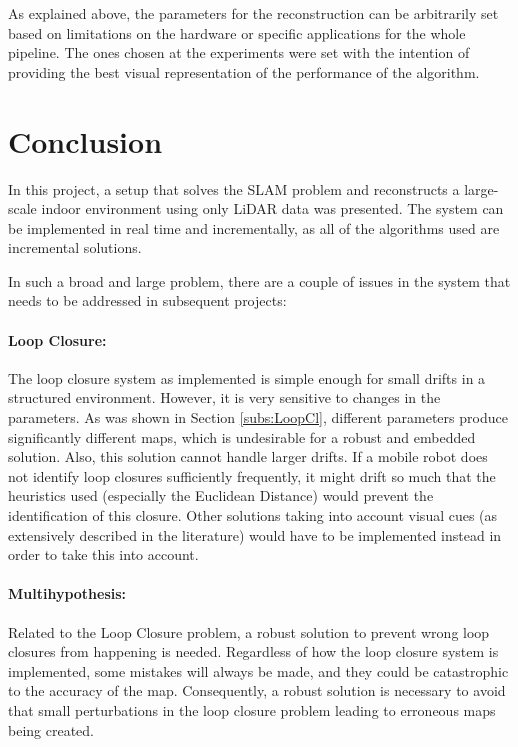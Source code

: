\documentclass[11pt]{article}
\begin{document}
As explained above, the parameters for the reconstruction can be arbitrarily set based on limitations on the hardware or specific applications for the whole pipeline. The ones chosen at the experiments were set with the intention of providing the best visual representation of the performance of the algorithm.
		
	\newpage
	\section{Conclusion}
	
In this project, a setup that solves the SLAM problem and reconstructs a large-scale indoor environment using only LiDAR data was presented. The system can be implemented in real time and incrementally, as all of the algorithms used are incremental solutions.
		
In such a broad and large problem, there are a couple of issues in the system that needs to be addressed in subsequent projects:
	
\paragraph{Loop Closure: } The loop closure system as implemented is simple enough for small drifts in a structured environment. However, it is very sensitive to changes in the parameters. As was shown in Section \ref{subs:LoopCl}, different parameters produce significantly different maps, which is undesirable for a robust and embedded solution. Also, this solution cannot handle larger drifts. If a mobile robot does not identify loop closures sufficiently frequently, it might drift so much that the heuristics used (especially the Euclidean Distance) would prevent the identification of this closure. Other solutions taking into account visual cues (as extensively described in the literature) would have to be implemented instead in order to take this into account.
	
\paragraph{Multihypothesis: } Related to the Loop Closure problem, a robust solution to prevent wrong loop closures from happening is needed. Regardless of how the loop closure system is implemented, some mistakes will always be made, and they could be catastrophic to the accuracy of the map. Consequently, a robust solution is necessary to avoid that small perturbations in the loop closure problem leading to erroneous maps being created.
	
\end{document}
